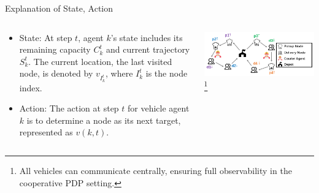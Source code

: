 \documentclass{beamer}
\begin{document}
\begin{frame}{Explanation of State, Action}
	\begin{columns}
		\begin{column}{0.5\textwidth}
			\begin{itemize}
				\small
				\item State: At step $t$, agent $k$'s state includes its remaining capacity $C_k^t$ and current trajectory $S_k^t$. The current location, the last visited node, is denoted by $v_{I_k^t}$, where $I_k^t$ is the node index.
				\item Action: The action at step $t$ for vehicle agent $k$ is to determine a node as its next target, represented as $v(k,t).$
			\end{itemize}
		\end{column}
		\begin{column}{0.5\textwidth}
			\centering
			\includegraphics[width=\textwidth]{show.png}
			\footnote{\tiny All vehicles can communicate centrally, ensuring full observability in the cooperative PDP setting.}
		\end{column}
	\end{columns}
\end{frame}
\end{document}
